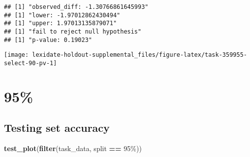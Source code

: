 \documentclass[
]{book}
\newenvironment{Shaded}{\begin{snugshade}}{\end{snugshade}}
\newcommand{\AttributeTok}[1]{\textcolor[rgb]{0.13,0.29,0.53}{#1}}
\newcommand{\DecValTok}[1]{\textcolor[rgb]{0.00,0.00,0.81}{#1}}
\newcommand{\FunctionTok}[1]{\textcolor[rgb]{0.13,0.29,0.53}{\textbf{#1}}}
\newcommand{\NormalTok}[1]{#1}
\newcommand{\OtherTok}[1]{\textcolor[rgb]{0.56,0.35,0.01}{#1}}
\newcommand{\SpecialCharTok}[1]{\textcolor[rgb]{0.81,0.36,0.00}{\textbf{#1}}}
\newcommand{\StringTok}[1]{\textcolor[rgb]{0.31,0.60,0.02}{#1}}
\begin{document}
\begin{Shaded}
\end{Shaded}

\begin{verbatim}
## [1] "observed_diff: -1.30766861645993"
## [1] "lower: -1.97012862430494"
## [1] "upper: 1.97013135879071"
## [1] "fail to reject null hypothesis"
## [1] "p-value: 0.19023"
\end{verbatim}

\texttt{[image: lexidate-holdout-supplemental\_files/figure-latex/task-359955-select-90-pv-1]}

\hypertarget{section-14}{%
\section{95\%}\label{section-14}}

\hypertarget{testing-set-accuracy-14}{%
\subsection{Testing set accuracy}\label{testing-set-accuracy-14}}

\begin{Shaded}
\begin{Highlighting}[]
\FunctionTok{test\_plot}\NormalTok{(}\FunctionTok{filter}\NormalTok{(task\_data, split }\SpecialCharTok{==} \StringTok{\textquotesingle{}95\%\textquotesingle{}}\NormalTok{))}
\end{Highlighting}
\end{Shaded}
\end{document}
